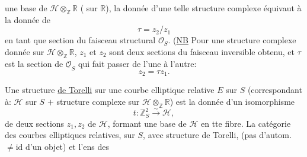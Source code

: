 une base de $\mathcal H\otimes_{\mathbb Z}\mathbb R$ ( sur $\mathbb R$), la donnée d'une telle structure complexe équivaut à la donnée de
\begin{equation}
\tau=z_2/z_1
\tag{3}
\end{equation}
en tant que section du faisceau structural $\mathcal O_S$. (\uline{NB}  Pour une structure complexe donnée sur $\mathcal H\otimes_{\mathbb Z}\mathbb R$, $z_1$ et $z_2$ sont deux sections du faisceau inversible obtenu, et $\tau$ est la section de $\underline{\mathcal O}_S$ qui fait passer de l'une à l'autre:
\begin{equation}
z_2=\tau z_1.
\tag{3 bis}
\end{equation}

Une structure \uline{de Torelli} sur une  courbe elliptique relative $E$ sur $S$ (correspondant à: $\mathcal H$ sur $S$ $+$ structure complexe sur $\mathcal H\otimes_{\mathbb Z}\mathbb R$) est la donnée d'un isomorphisme
\begin{equation}
t:\mathbb Z_S^2\xrightarrow{\sim}\mathcal H,
\tag{4}
\end{equation}
  de deux sections $z_1,z_2$ de $\mathcal H$,  formant une base de $\mathcal H$ en tte fibre. La catégorie des courbes elliptiques relatives, sur $S$, avec structure de Torelli,   (pas d'autom. $\ne\mathrm{id}$ d'un objet) et l'ens des

